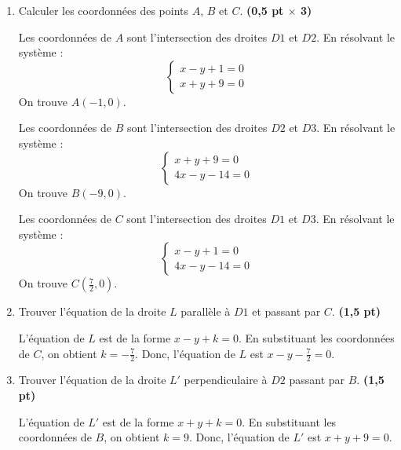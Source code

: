 \documentclass[12pt]{article}
\begin{document}
\begin{enumerate}
    \item Calculer les coordonnées des points \(A\), \(B\) et \(C\). \textbf{(0,5 pt $\times$ 3)}
    
    Les coordonnées de \(A\) sont l'intersection des droites \(D1\) et \(D2\). En résolvant le système :
    \[
    \begin{cases}
    x - y + 1 = 0 \\
    x + y + 9 = 0
    \end{cases}
    \]
    On trouve \(A(-1, 0)\).
    
    Les coordonnées de \(B\) sont l'intersection des droites \(D2\) et \(D3\). En résolvant le système :
    \[
    \begin{cases}
    x + y + 9 = 0 \\
    4x - y - 14 = 0
    \end{cases}
    \]
    On trouve \(B(-9, 0)\).
    
    Les coordonnées de \(C\) sont l'intersection des droites \(D1\) et \(D3\). En résolvant le système :
    \[
    \begin{cases}
    x - y + 1 = 0 \\
    4x - y - 14 = 0
    \end{cases}
    \]
    On trouve \(C\left(\frac{7}{2}, 0\right)\).
    
    \item Trouver l’équation de la droite \(L\) parallèle à \(D1\) et passant par \(C\). \textbf{(1,5 pt)}
    
    L'équation de \(L\) est de la forme \(x - y + k = 0\). En substituant les coordonnées de \(C\), on obtient \(k = -\frac{7}{2}\). Donc, l'équation de \(L\) est \(x - y - \frac{7}{2} = 0\).
    
    \item Trouver l’équation de la droite \(L'\) perpendiculaire à \(D2\) passant par \(B\). \textbf{(1,5 pt)}
    
    L'équation de \(L'\) est de la forme \(x + y + k = 0\). En substituant les coordonnées de \(B\), on obtient \(k = 9\). Donc, l'équation de \(L'\) est \(x + y + 9 = 0\).
\end{enumerate}
\end{document}

